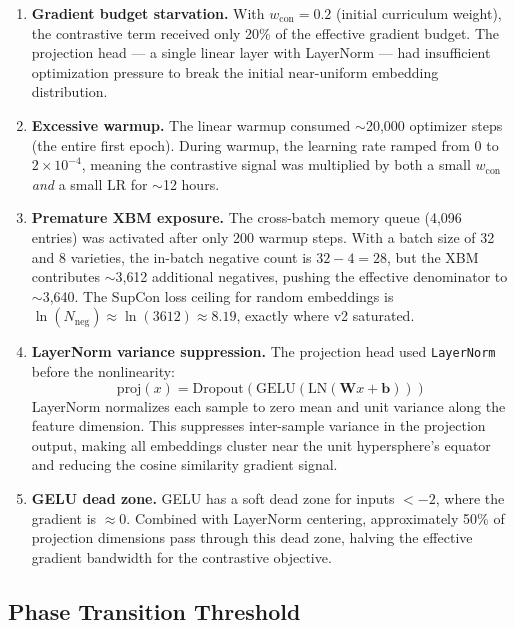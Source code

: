\documentclass[11pt,a4paper]{article}
\begin{document}
\begin{enumerate}[label=\textbf{RC\arabic*}]
\item \textbf{Gradient budget starvation.}
With $w_{\text{con}} = 0.2$ (initial curriculum weight), the contrastive term
received only 20\% of the effective gradient budget. The projection head ---
a single linear layer with LayerNorm --- had insufficient optimization
pressure to break the initial near-uniform embedding distribution.

\item \textbf{Excessive warmup.}
The linear warmup consumed $\sim$20{,}000 optimizer steps (the entire first
epoch). During warmup, the learning rate ramped from 0 to $2 \times 10^{-4}$,
meaning the contrastive signal was multiplied by both a small $w_{\text{con}}$
\emph{and} a small LR for $\sim$12 hours.

\item \textbf{Premature XBM exposure.}
The cross-batch memory queue (4{,}096 entries) was activated after only 200
warmup steps. With a batch size of 32 and 8 varieties, the in-batch negative
count is $32 - 4 = 28$, but the XBM contributes $\sim$3{,}612 additional
negatives, pushing the effective denominator to $\sim$3{,}640. The SupCon loss
ceiling for random embeddings is $\ln(N_{\text{neg}}) \approx \ln(3612)
\approx 8.19$, exactly where v2 saturated.

\item \textbf{LayerNorm variance suppression.}
The projection head used \texttt{LayerNorm} before the nonlinearity:
\[
\text{proj}(x) = \text{Dropout}(\text{GELU}(\text{LN}(\mathbf{W}x + \mathbf{b})))
\]
LayerNorm normalizes each sample to zero mean and unit variance along the
feature dimension. This suppresses inter-sample variance in the projection
output, making all embeddings cluster near the unit hypersphere's equator
and reducing the cosine similarity gradient signal.

\item \textbf{GELU dead zone.}
GELU has a soft dead zone for inputs $< -2$, where the gradient is
$\approx 0$. Combined with LayerNorm centering, approximately 50\% of
projection dimensions pass through this dead zone, halving the effective
gradient bandwidth for the contrastive objective.
\end{enumerate}

\subsection{Phase Transition Threshold}
\end{document}
